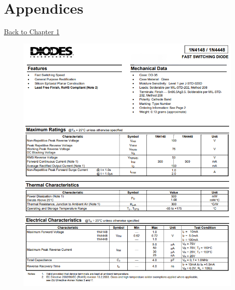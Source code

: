 \chapter*{Appendices}

\hyperlink{chapter.1}{Back to Chapter 1}

\FloatBarrier
\begin{figure}[h]
    \centering
    \includegraphics[width=0.9\linewidth]{Appendices/1N4148.png}
    \label{1N4148}
\end{figure}
\FloatBarrier
